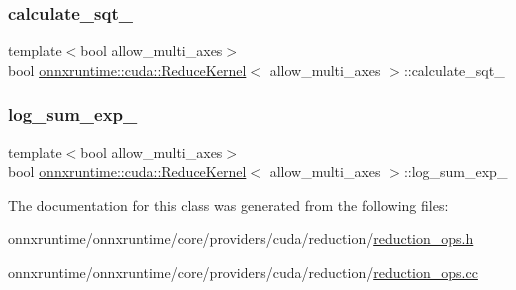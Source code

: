 \subsubsection{\texorpdfstring{calculate\+\_\+sqt\+\_\+}{calculate\_sqt\_}}
{\footnotesize\ttfamily template$<$bool allow\+\_\+multi\+\_\+axes$>$ \\
bool \mbox{\hyperlink{classonnxruntime_1_1cuda_1_1ReduceKernel}{onnxruntime\+::cuda\+::\+Reduce\+Kernel}}$<$ allow\+\_\+multi\+\_\+axes $>$\+::calculate\+\_\+sqt\+\_\+\hspace{0.3cm}{\ttfamily [protected]}}

\mbox{\label{classonnxruntime_1_1cuda_1_1ReduceKernel_ae5c339a6fe3a74114dc1ca9b1baae9da}} 
\subsubsection{\texorpdfstring{log\+\_\+sum\+\_\+exp\+\_\+}{log\_sum\_exp\_}}
{\footnotesize\ttfamily template$<$bool allow\+\_\+multi\+\_\+axes$>$ \\
bool \mbox{\hyperlink{classonnxruntime_1_1cuda_1_1ReduceKernel}{onnxruntime\+::cuda\+::\+Reduce\+Kernel}}$<$ allow\+\_\+multi\+\_\+axes $>$\+::log\+\_\+sum\+\_\+exp\+\_\+\hspace{0.3cm}{\ttfamily [protected]}}



The documentation for this class was generated from the following files\+:\begin{DoxyCompactItemize}
\item 
onnxruntime/onnxruntime/core/providers/cuda/reduction/\mbox{\hyperlink{cuda_2reduction_2reduction__ops_8h}{reduction\+\_\+ops.\+h}}\item 
onnxruntime/onnxruntime/core/providers/cuda/reduction/\mbox{\hyperlink{cuda_2reduction_2reduction__ops_8cc}{reduction\+\_\+ops.\+cc}}\end{DoxyCompactItemize}
